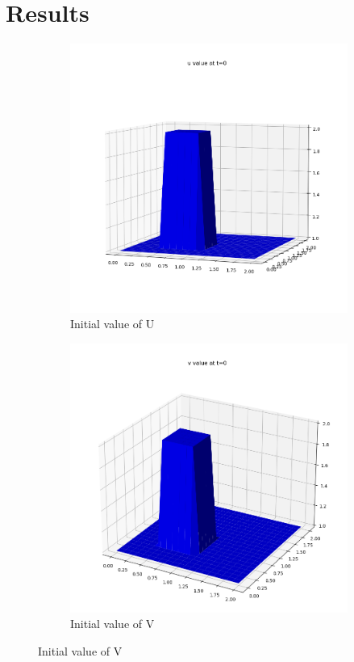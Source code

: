 \documentclass[conf]{new-aiaa}
\begin{document}
\section{Results}
\begin{figure}[!h]
	\begin{subfigure}{0.5\textwidth}
		\centering
		\includegraphics[scale=0.35]{images/u_initial.png}
		\caption{Initial value of U}
		\label{fig:01}
	\end{subfigure}
\begin{subfigure}{0.5\textwidth}
	\centering
	\includegraphics[scale=0.35]{images/v_initial.png}
	\caption{Initial value of V}
	\label{fig:02}
\end{subfigure}
\end{figure}
\end{document}
